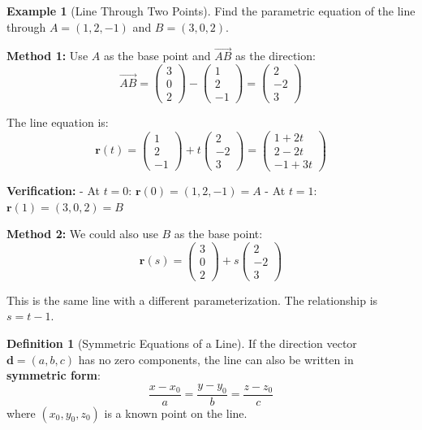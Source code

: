 \documentclass[12pt]{article}
\numberwithin{equation}{section}
\newcommand{\vect}[1]{\boldsymbol{#1}}   %
\theoremstyle{plain}
\theoremstyle{definition}
\newtheorem{definition}[theorem]{Definition}
\newtheorem{example}[theorem]{Example}
\theoremstyle{remark}
\begin{document}
\begin{example}[Line Through Two Points]
Find the parametric equation of the line through $A = (1, 2, -1)$ and $B = (3, 0, 2)$.

\textbf{Method 1:} Use $A$ as the base point and $\overrightarrow{AB}$ as the direction:
$$\overrightarrow{AB} = \begin{pmatrix} 3 \\ 0 \\ 2 \end{pmatrix} - \begin{pmatrix} 1 \\ 2 \\ -1 \end{pmatrix} = \begin{pmatrix} 2 \\ -2 \\ 3 \end{pmatrix}$$

The line equation is:
$$\vect{r}(t) = \begin{pmatrix} 1 \\ 2 \\ -1 \end{pmatrix} + t\begin{pmatrix} 2 \\ -2 \\ 3 \end{pmatrix} = \begin{pmatrix} 1 + 2t \\ 2 - 2t \\ -1 + 3t \end{pmatrix}$$

\textbf{Verification:}
- At $t = 0$: $\vect{r}(0) = (1, 2, -1) = A$ \checkmark
- At $t = 1$: $\vect{r}(1) = (3, 0, 2) = B$ \checkmark

\textbf{Method 2:} We could also use $B$ as the base point:
$$\vect{r}(s) = \begin{pmatrix} 3 \\ 0 \\ 2 \end{pmatrix} + s\begin{pmatrix} 2 \\ -2 \\ 3 \end{pmatrix}$$

This is the same line with a different parameterization. The relationship is $s = t - 1$.
\end{example}

\begin{definition}[Symmetric Equations of a Line]
If the direction vector $\vect{d} = (a, b, c)$ has no zero components, the line can also be written in \textbf{symmetric form}:
$$\frac{x - x_0}{a} = \frac{y - y_0}{b} = \frac{z - z_0}{c}$$
where $(x_0, y_0, z_0)$ is a known point on the line.
\end{definition}
\end{document}
